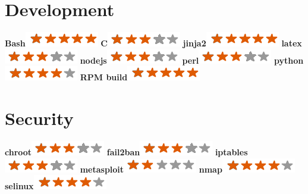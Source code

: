 \documentclass[]{friggeri-cv}
\begin{document}
\begin{aside}
    \section{Development}
        \textbf{Bash}\includegraphics[scale=0.40]{img/5stars.png}
        \textbf{C}\includegraphics[scale=0.40]{img/3stars.png}
        \textbf{jinja2}\includegraphics[scale=0.40]{img/5stars.png}
        \textbf{latex}\includegraphics[scale=0.40]{img/3stars.png}
        \textbf{nodejs}\includegraphics[scale=0.40]{img/3stars.png}
        \textbf{perl}\includegraphics[scale=0.40]{img/3stars.png}
        \textbf{python}\includegraphics[scale=0.40]{img/4stars.png}
        \textbf{RPM build}\includegraphics[scale=0.40]{img/5stars.png}
        ~
    \section{Security}
        \textbf{chroot}\includegraphics[scale=0.40]{img/3stars.png}
        \textbf{fail2ban}\includegraphics[scale=0.40]{img/3stars.png}
        \textbf{iptables}\includegraphics[scale=0.40]{img/3stars.png}
        \textbf{metasploit}\includegraphics[scale=0.40]{img/2stars.png}
        \textbf{nmap}\includegraphics[scale=0.40]{img/4stars.png}
        \textbf{selinux}\includegraphics[scale=0.40]{img/4stars.png}
        ~

\end{aside}
\end{document}
